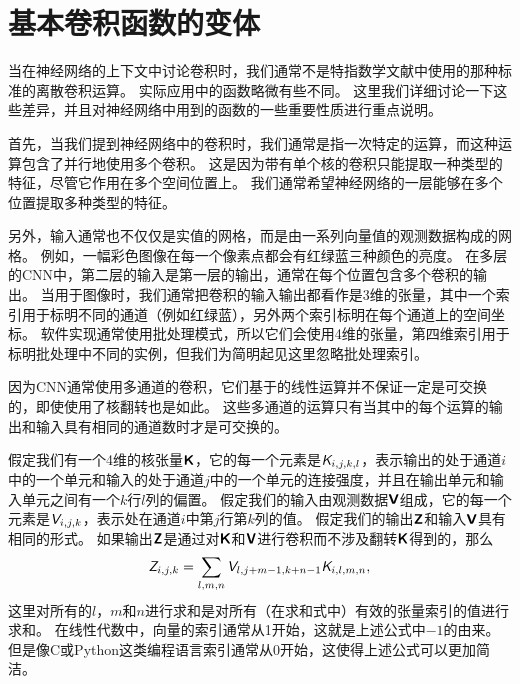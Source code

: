
\section{基本卷积函数的变体}
\label{sec:variants_of_the_basic_convolution_function}

当在神经网络的上下文中讨论卷积时，我们通常不是特指数学文献中使用的那种标准的离散卷积运算。
实际应用中的函数略微有些不同。
这里我们详细讨论一下这些差异，并且对神经网络中用到的函数的一些重要性质进行重点说明。

首先，当我们提到神经网络中的卷积时，我们通常是指一次特定的运算，而这种运算包含了并行地使用多个卷积。
这是因为带有单个核的卷积只能提取一种类型的特征，尽管它作用在多个空间位置上。
我们通常希望神经网络的一层能够在多个位置提取多种类型的特征。

另外，输入通常也不仅仅是实值的网格，而是由一系列向量值的观测数据构成的网格。
例如，一幅彩色图像在每一个像素点都会有红绿蓝三种颜色的亮度。
在多层的\gls{CNN}中，第二层的输入是第一层的输出，通常在每个位置包含多个卷积的输出。
当用于图像时，我们通常把卷积的输入输出都看作是3维的张量，其中一个索引用于标明不同的通道（例如红绿蓝），另外两个索引标明在每个通道上的空间坐标。
软件实现通常使用批处理模式，所以它们会使用4维的张量，第四维索引用于标明批处理中不同的实例，但我们为简明起见这里忽略批处理索引。

因为\gls{CNN}通常使用多通道的卷积，它们基于的线性运算并不保证一定是可交换的，即使使用了核翻转也是如此。
这些多通道的运算只有当其中的每个运算的输出和输入具有相同的通道数时才是可交换的。

假定我们有一个4维的核张量$\textsf{\textbf{K}}$，它的每一个元素是$\textit{\textsf{K}}_{i,j,k,l}$，表示输出的处于通道$i$中的一个单元和输入的处于通道$j$中的一个单元的连接强度，并且在输出单元和输入单元之间有一个$k$行$l$列的偏置。
假定我们的输入由观测数据$\textsf{\textbf{V}}$组成，它的每一个元素是$\textit{\textsf{V}}_{i,j,k}$，表示处在通道$i$中第$j$行第$k$列的值。
假定我们的输出$\textsf{\textbf{Z}}$和输入$\textsf{\textbf{V}}$具有相同的形式。
如果输出$\textsf{\textbf{Z}}$是通过对$\textsf{\textbf{K}}$和$\textsf{\textbf{V}}$进行卷积而不涉及翻转$\textsf{\textbf{K}}$得到的，那么
\begin{equation}
\textit{\textsf{Z}}_{i,j,k} = \sum_{l,m,n} \textit{\textsf{V}}_{l, j+m-1, k+n-1} \textit{\textsf{K}}_{i,l,m,n},
\end{equation}
这里对所有的$l$，$m$和$n$进行求和是对所有（在求和式中）有效的张量索引的值进行求和。
在线性代数中，向量的索引通常从1开始，这就是上述公式中$-1$的由来。
但是像C或Python这类编程语言索引通常从0开始，这使得上述公式可以更加简洁。

 
